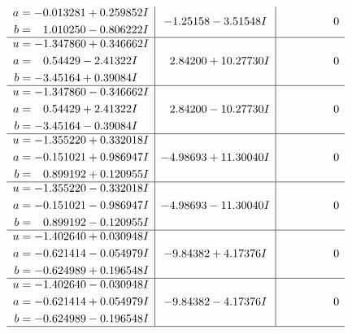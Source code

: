 \documentclass[1p]{elsarticle_modified}
\theoremstyle{definition}
\begin{document}
$$\begin{array}{c|c|c}
\begin{aligned}
a &= -0.013281 + 0.259852 I \\
b &= \phantom{-}1.010250 - 0.806222 I\end{aligned}
 & -1.25158 - 3.51548 I & \phantom{-0.000000 } 0 \\ \hline\begin{aligned}
u &= -1.347860 + 0.346662 I \\
a &= \phantom{-}0.54429 - 2.41322 I \\
b &= -3.45164 + 0.39084 I\end{aligned}
 & \phantom{-}2.84200 + 10.27730 I & \phantom{-0.000000 } 0 \\ \hline\begin{aligned}
u &= -1.347860 - 0.346662 I \\
a &= \phantom{-}0.54429 + 2.41322 I \\
b &= -3.45164 - 0.39084 I\end{aligned}
 & \phantom{-}2.84200 - 10.27730 I & \phantom{-0.000000 } 0 \\ \hline\begin{aligned}
u &= -1.355220 + 0.332018 I \\
a &= -0.151021 + 0.986947 I \\
b &= \phantom{-}0.899192 + 0.120955 I\end{aligned}
 & -4.98693 + 11.30040 I & \phantom{-0.000000 } 0 \\ \hline\begin{aligned}
u &= -1.355220 - 0.332018 I \\
a &= -0.151021 - 0.986947 I \\
b &= \phantom{-}0.899192 - 0.120955 I\end{aligned}
 & -4.98693 - 11.30040 I & \phantom{-0.000000 } 0 \\ \hline\begin{aligned}
u &= -1.402640 + 0.030948 I \\
a &= -0.621414 - 0.054979 I \\
b &= -0.624989 + 0.196548 I\end{aligned}
 & -9.84382 + 4.17376 I & \phantom{-0.000000 } 0 \\ \hline\begin{aligned}
u &= -1.402640 - 0.030948 I \\
a &= -0.621414 + 0.054979 I \\
b &= -0.624989 - 0.196548 I\end{aligned}
 & -9.84382 - 4.17376 I & \phantom{-0.000000 } 0\\
 \hline 
 \end{array}$$\newpage$$\begin{array}{c|c|c}  

\end{array}$$
\end{document}
